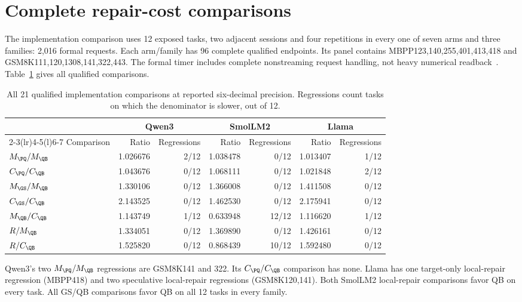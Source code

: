\section{Complete repair-cost comparisons}
\label{supp:cost}
The implementation comparison uses 12 exposed tasks, two adjacent sessions and four repetitions in every one of seven arms and three families: 2,016 formal requests. Each arm/family has 96 complete qualified endpoints. Its panel contains MBPP123,140,255,401,413,418 and GSM8K111,120,1308,141,322,443. The formal timer includes complete nonstreaming request handling, not heavy numerical readback~\cite{rtxrepair}. Table~\ref{tab:allrepair} gives all qualified comparisons.

\begin{table}[t]\centering\small
\caption{All 21 qualified implementation comparisons at reported six-decimal precision. Regressions count tasks on which the denominator is slower, out of 12.}\label{tab:allrepair}
\begin{tabular}{@{}lrrrrrr@{}}\toprule
&\multicolumn{2}{c}{Qwen3}&\multicolumn{2}{c}{SmolLM2}&\multicolumn{2}{c}{Llama}\\
\cmidrule(lr){2-3}\cmidrule(lr){4-5}\cmidrule(l){6-7}
Comparison&Ratio&Regressions&Ratio&Regressions&Ratio&Regressions\\\midrule
$M_{\PQ}/M_{\QB}$ & 1.026676 & 2/12 & 1.038478 & 0/12 & 1.013407 & 1/12\\
$C_{\PQ}/C_{\QB}$ & 1.043676 & 0/12 & 1.068111 & 0/12 & 1.021848 & 2/12\\
$M_{\GS}/M_{\QB}$ & 1.330106 & 0/12 & 1.366008 & 0/12 & 1.411508 & 0/12\\
$C_{\GS}/C_{\QB}$ & 2.143525 & 0/12 & 1.462530 & 0/12 & 2.175941 & 0/12\\
$M_{\QB}/C_{\QB}$ & 1.143749 & 1/12 & 0.633948 & 12/12 & 1.116620 & 1/12\\
$R/M_{\QB}$ & 1.334051 & 0/12 & 1.369890 & 0/12 & 1.426161 & 0/12\\
$R/C_{\QB}$ & 1.525820 & 0/12 & 0.868439 & 10/12 & 1.592480 & 0/12\\
\bottomrule\end{tabular}
\end{table}

Qwen3's two $M_{\PQ}/M_{\QB}$ regressions are GSM8K141 and 322. Its $C_{\PQ}/C_{\QB}$ comparison has none. Llama has one target-only local-repair regression (MBPP418) and two speculative local-repair regressions (GSM8K120,141). Both SmolLM2 local-repair comparisons favor QB on every task. All GS/QB comparisons favor QB on all 12 tasks in every family.

